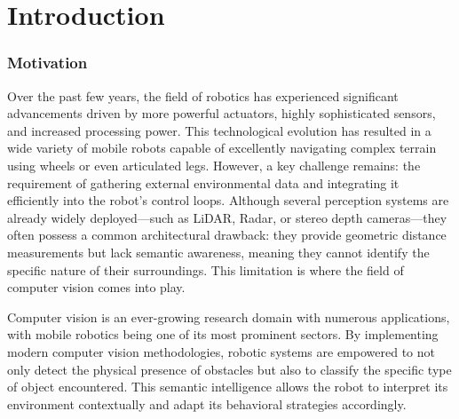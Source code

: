 % 
%
%
%
% 
% 
% 
%

\chapter{Introduction} %

\subsection{Motivation} %
Over the past few years, the field of robotics has experienced significant advancements driven by more powerful actuators, highly sophisticated sensors, and increased processing power. This technological evolution has resulted in a wide variety of mobile robots capable of excellently navigating complex terrain using wheels or even articulated legs. However, a key challenge remains: the requirement of gathering external environmental data and integrating it efficiently into the robot's control loops. Although several perception systems are already widely deployed—such as LiDAR, Radar, or stereo depth cameras—they often possess a common architectural drawback: they provide geometric distance measurements but lack semantic awareness, meaning they cannot identify the specific nature of their surroundings. This limitation is where the field of computer vision comes into play.

Computer vision is an ever-growing research domain with numerous applications, with mobile robotics being one of its most prominent sectors. By implementing modern computer vision methodologies, robotic systems are empowered to not only detect the physical presence of obstacles but also to classify the specific type of object encountered. This semantic intelligence allows the robot to interpret its environment contextually and adapt its behavioral strategies accordingly.


